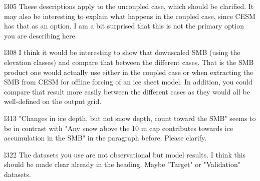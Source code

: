\documentclass[12pt,oneside,a4paper]{article}%
\begin{document}
l305 These descriptions apply to the uncoupled case, which should be clarified. It may also be interesting to explain what happens in the coupled case, since CESM has that as an option. I am a bit surprised that this is not the primary option you are describing here. \newline

{\color{blue}{After addressing your last comment, we believe the paragraph is valid for both coupled and un-coupled cases.}} \newline

l308 I think it would be interesting to show that downscaled SMB (using the elevation classes) and compare that between the different cases. That is the SMB product one would actually use either in the coupled case or when extracting the SMB from CESM for offline forcing of an ice sheet model. In addition, you could compare that result more easily between the different cases as they would all be well-defined on the output grid. \newline

{\color{blue}{We agree that would be interesting. The reason we didn't employ this approach -- which to be clear, we interpret as evaluating the SMB field downscaled to the 4km CISM grid -- is that only the SMB is downscaled. It is the resolution sensitivity of the individual components of the SMB that is the main focus of this study. It's representation on the CLM grid is still quite advanced, owing to the EC scheme. I suppose we could have tried to hack the code to downscale the SMB components to CISM, but we didn't go down that road (and no telling the number of issues that would've cropped up going down that road). That said, our approach of mapping to the common ice mask is quite complicated as well.}} \newline

l313 "Changes in ice depth, but not snow depth, count toward the SMB" seems to be in contrast with "Any snow above the 10 m cap contributes towards ice accumulation in the SMB" in the paragraph before. Please clarify. \newline

{\color{blue}{I'm not sure I see the contradiction the reviewer is referring to, but this a clearly a redundancy that we've eliminated by consolidating the paragraphs.}} \newline

l322 The datasets you use are not observational but model results. I think this should be made clear already in the heading. Maybe "Target" or "Validation" datasets. \newline
\end{document}
